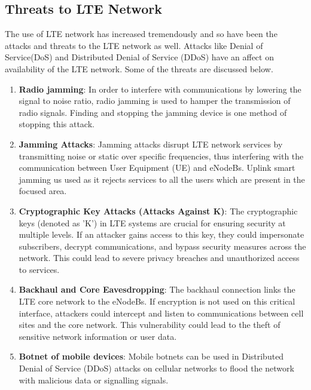 \documentclass[conference]{IEEEtran}
\begin{document}
\subsection{Threats to LTE Network}
The use of LTE network has increased tremendously and so have been the attacks and threats to the LTE network as well. Attacks like Denial of Service(DoS) and Distributed Denial of Service (DDoS) \cite{kamel2014survey}have an affect on availability of the LTE network. Some of the threats are discussed below.

\begin{enumerate}
            \item \textbf{Radio jamming}:
            In order to interfere with communications by lowering the signal to noise ratio, radio jamming is used to hamper the transmission of radio signals.  Finding and stopping the jamming device is one method of stopping this attack\cite{jover2013security}.

            \item \textbf{Jamming Attacks}:
            Jamming attacks disrupt LTE network services by transmitting noise or static over specific frequencies, thus interfering with the communication between User Equipment (UE) and eNodeBs\cite{jover2013security}. Uplink smart jamming us used as it rejects services to all the users which are present in the focused area\cite{jover2014enhancing}.

            \item \textbf{Cryptographic Key Attacks (Attacks Against K)}:
            The cryptographic keys (denoted as 'K') in LTE systems are crucial for ensuring security at multiple levels. If an attacker gains access to this key, they could impersonate subscribers, decrypt communications, and bypass security measures across the network. This could lead to severe privacy breaches and unauthorized access to services\cite{cichonski2016guide}. 

            \item \textbf{Backhaul and Core Eavesdropping}:
            The backhaul connection links the LTE core network to the eNodeBs. If encryption is not used on this critical interface, attackers could intercept and listen to communications between cell sites and the core network. This vulnerability could lead to the theft of sensitive network information or user data\cite{cichonski2016guide}. 

            \item \textbf{Botnet of mobile devices}:
            Mobile botnets can be used in Distributed Denial of Service (DDoS) attacks on cellular networks to flood the network with malicious data or signalling signals\cite{cichonski2016guide}. 


\end{enumerate}
\end{document}
